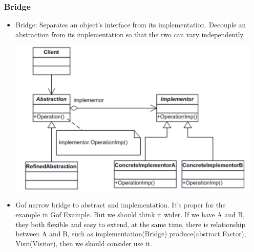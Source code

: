\documentclass[a4paper,12pt,twoside]{book}
\begin{document}
\subsubsection{Bridge }
\begin{itemize}
\item Bridge: Separates an object’s interface from its implementation. Decouple an abstraction from its implementation so that the two can vary independently.

\includegraphics[scale=0.69]{pics/bridge.png}

\item Gof narrow bridge to abstract and implementation. It's proper for the example in Gof Example. But we should think it wider. If we have A and B, they both flexible and easy to extend, at the same time, there is relationship between A and B, such as implementation(Bridge) produce(abstract Factor), Visit(Visitor), then we should consider use it. 
\end{itemize}
\end{document}
